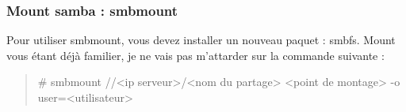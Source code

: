 \documentclass[a4paper,11pt]{article}
\newcommand{\commande}[1] {
    \begin{quote}
    \tt\raggedright #1 
    \end{quote}
}
\begin{document}
\subsubsection{Mount samba : smbmount}
\par Pour utiliser smbmount, vous devez installer un nouveau paquet : smbfs. Mount vous étant déjà familier, je ne vais pas m'attarder sur la commande suivante :
\commande{\# smbmount //<ip serveur>/<nom du partage> <point de montage> -o user=<utilisateur>}
\end{document}
